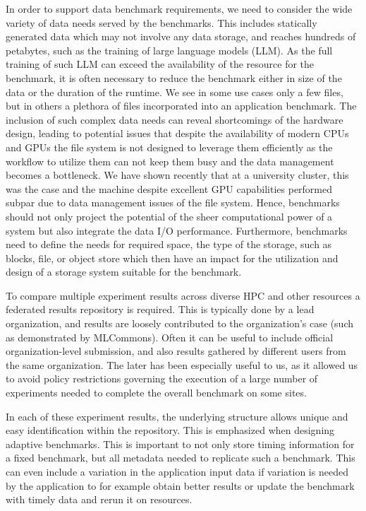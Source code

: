 \documentclass[sigconf]{acmart}
\begin{document}
In order to support data benchmark requirements, we need to consider the wide variety of data needs served by the benchmarks. This includes statically generated data which may not involve any data storage, and reaches hundreds of petabytes, such as  the training of large language models (LLM). As the full training of such LLM can exceed the availability of the resource for the benchmark, it is often necessary to reduce the benchmark either in size of the data or the duration of the runtime. 
We see in some use cases only a few files, but in others a plethora of files incorporated into an application benchmark. The inclusion of such complex data needs can reveal shortcomings of the hardware design, leading to potential issues that despite the availability of modern CPUs and GPUs the file system is not designed to leverage them efficiently as the workflow to utilize them can not keep them busy and the data management becomes a bottleneck. We have shown recently that at a university cluster, this was the case and the machine despite excellent GPU capabilities performed subpar due to data management issues of the file system. Hence, benchmarks should not only project the potential of the sheer computational power of a system but also integrate the data I/O performance. Furthermore, benchmarks need to define the needs for required space, the type of the storage, such as blocks, file, or object store which then have an impact for the utilization and design of a storage system suitable for the benchmark.

To compare multiple experiment results across diverse HPC and other resources a federated results repository is required. This is typically done by a lead organization, and results are loosely contributed to the organization's case (such as demonstrated by MLCommons). Often it can be useful to include official organization-level submission, and also results gathered by different users from the same organization. The later has been especially useful to us, as it allowed us to avoid policy restrictions governing the execution of a large number of experiments needed to complete the overall benchmark on some sites.

In each of these experiment results, the underlying structure allows unique and easy identification within the repository. This is emphasized when designing adaptive benchmarks. This is important to not only store timing information for a fixed benchmark, but all metadata needed to replicate such a benchmark. This can even include a variation in the application input data if variation is needed by the application to for example obtain better results or update the benchmark with timely data and rerun it on resources.
\end{document}
